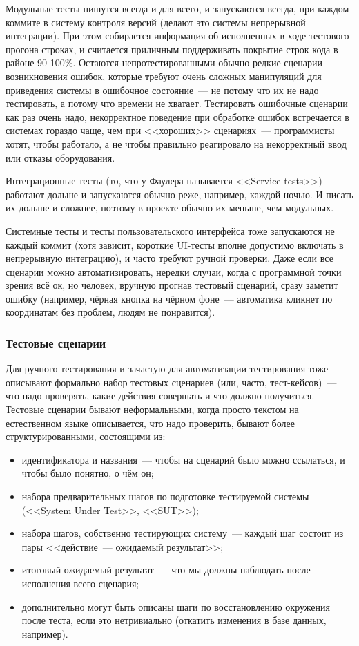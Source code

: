 \documentclass{../../text-style}
\begin{document}
Модульные тесты пишутся всегда и для всего, и запускаются всегда, при каждом коммите в систему контроля версий (делают это системы непрерывной интеграции). При этом собирается информация об исполненных в ходе тестового прогона строках, и считается приличным поддерживать покрытие строк кода в районе 90-100\%. Остаются непротестированными обычно редкие сценарии возникновения ошибок, которые требуют очень сложных манипуляций для приведения системы в ошибочное состояние~--- не потому что их не надо тестировать, а потому что времени не хватает. Тестировать ошибочные сценарии как раз очень надо, некорректное поведение при обработке ошибок встречается в системах гораздо чаще, чем при <<хороших>> сценариях~--- программисты хотят, чтобы работало, а не чтобы правильно реагировало на некорректный ввод или отказы оборудования.

Интеграционные тесты (то, что у Фаулера называется <<Service tests>>) работают дольше и запускаются обычно реже, например, каждой ночью. И писать их дольше и сложнее, поэтому в проекте обычно их меньше, чем модульных.

Системные тесты и тесты пользовательского интерфейса тоже запускаются не каждый коммит (хотя зависит, короткие UI-тесты вполне допустимо включать в непрерывную интеграцию), и часто требуют ручной проверки. Даже если все сценарии можно автоматизировать, нередки случаи, когда с программной точки зрения всё ок, но человек, вручную прогнав тестовый сценарий, сразу заметит ошибку (например, чёрная кнопка на чёрном фоне~--- автоматика кликнет по координатам без проблем, людям не понравится).

\subsubsection{Тестовые сценарии}

Для ручного тестирования и зачастую для автоматизации тестирования тоже описывают формально набор тестовых сценариев (или, часто, тест-кейсов)~--- что надо проверять, какие действия совершать и что должно получиться. Тестовые сценарии бывают неформальными, когда просто текстом на естественном языке описывается, что надо проверить, бывают более структурированными, состоящими из:

\begin{itemize}
    \item идентификатора и названия~--- чтобы на сценарий было можно ссылаться, и чтобы было понятно, о чём он;
    \item набора предварительных шагов по подготовке тестируемой системы (<<System Under Test>>, <<SUT>>);
    \item набора шагов, собственно тестирующих систему~--- каждый шаг состоит из пары <<действие~--- ожидаемый результат>>;
    \item итоговый ожидаемый результат~--- что мы должны наблюдать после исполнения всего сценария;
    \item дополнительно могут быть описаны шаги по восстановлению окружения после теста, если это нетривиально (откатить изменения в базе данных, например).
\end{itemize}
\end{document}
